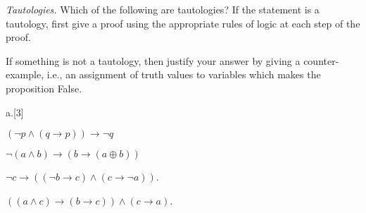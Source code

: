 \item[10] {\em Tautologies.}
Which of the following are tautologies? If the statement is a tautology, first 
give a proof using the appropriate rules of logic at each  step of the proof.

If something is not a tautology, then justify your answer by giving a counter-example, i.e., an assignment of truth values to variables which
makes the proposition False.
\begin{question}{a.}[3]
\item[2] $(\lnot p \land (q \rightarrow p)) \rightarrow \lnot q$
\begin{Questions}
\vfill
\end{Questions}

\item[2] $\lnot(a \land b) \rightarrow (b \rightarrow (a \oplus b))$
\begin{Questions}
\vfill\eject
\end{Questions}

\item[3] $\lnot c \rightarrow ((\lnot b \rightarrow c)\land (c \rightarrow \lnot a))$.
\begin{Questions}
\vfill
\end{Questions}

\item[3] $((a \land c) \rightarrow (b \rightarrow c)) \land (c \rightarrow a)$.
\end{question}

\begin{Questions}
\vfill\eject
\end{Questions}